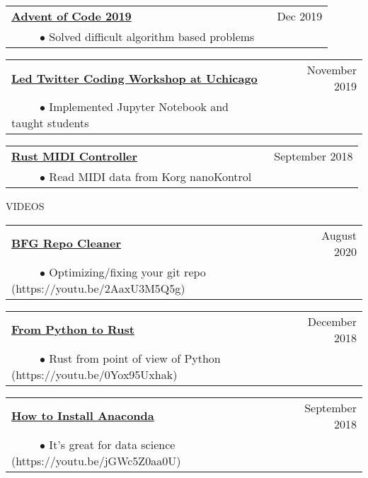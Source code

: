 \documentclass[11pt]{article}
\begin{document}
\begin{tabularx}{\linewidth}{l X r}
\textbf{\href{https://github.com/silverdrake11/advent_of_code_2019_kevin}{Advent of Code 2019}} & & Dec 2019  \\
~~~~~$\bullet$ Solved difficult algorithm based problems\\
\end{tabularx}

\begin{tabularx}{\linewidth}{l X r}
\textbf{\href{https://github.com/silverdrake11/twitter_uchicago_workshop}{Led Twitter Coding Workshop at Uchicago}} & & November 2019 \\
~~~~~$\bullet$ Implemented Jupyter Notebook and taught students\\
\end{tabularx}

\begin{tabularx}{\linewidth}{l X r}
\textbf{\href{https://github.com/silverdrake11/rustkontrol/blob/master/src/main.rs}{Rust MIDI Controller}} & & September 2018 \\
~~~~~$\bullet$ Read MIDI data from Korg nanoKontrol\\
\end{tabularx}


\vspace {.8cm}

{VIDEOS}
\vspace {0.4cm}


\begin{tabularx}{\linewidth}{l X r}
\textbf{\href{https://www.youtube.com/watch?v=2AaxU3M5Q5g\&t=1903s}{BFG Repo Cleaner}} & & August 2020 \\
~~~~~$\bullet$ Optimizing/fixing your git repo (https://youtu.be/2AaxU3M5Q5g)\\
\end{tabularx}

\begin{tabularx}{\linewidth}{l X r}
\textbf{\href{https://youtu.be/0Yox95Uxhak}{From Python to Rust}} & & December 2018 \\
~~~~~$\bullet$ Rust from point of view of Python (https://youtu.be/0Yox95Uxhak)\\
\end{tabularx}

\begin{tabularx}{\linewidth}{l X r}
\textbf{\href{https://youtu.be/jGWc5Z0aa0U}{How to Install Anaconda}} & & September 2018 \\
~~~~~$\bullet$ It's great for data science (https://youtu.be/jGWc5Z0aa0U)\\
\end{tabularx}
\end{document}
